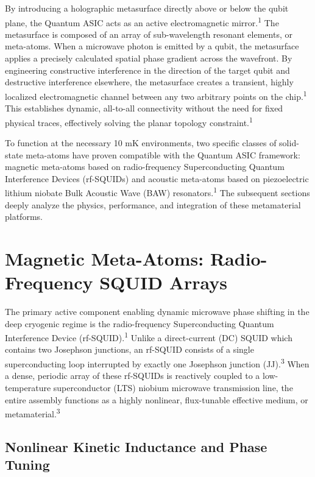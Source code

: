 \documentclass[11pt, a4paper]{article}
\begin{document}
By introducing a holographic metasurface directly above or below the qubit plane, the Quantum ASIC acts as an active electromagnetic mirror.\textsuperscript{1} The metasurface is composed of an array of sub-wavelength resonant elements, or meta-atoms. When a microwave photon is emitted by a qubit, the metasurface applies a precisely calculated spatial phase gradient across the wavefront. By engineering constructive interference in the direction of the target qubit and destructive interference elsewhere, the metasurface creates a transient, highly localized electromagnetic channel between any two arbitrary points on the chip.\textsuperscript{1} This establishes dynamic, all-to-all connectivity without the need for fixed physical traces, effectively solving the planar topology constraint.\textsuperscript{1}

To function at the necessary 10 mK environments, two specific classes of solid-state meta-atoms have proven compatible with the Quantum ASIC framework: magnetic meta-atoms based on radio-frequency Superconducting Quantum Interference Devices (rf-SQUIDs) and acoustic meta-atoms based on piezoelectric lithium niobate Bulk Acoustic Wave (BAW) resonators.\textsuperscript{1} The subsequent sections deeply analyze the physics, performance, and integration of these metamaterial platforms.

\section*{Magnetic Meta-Atoms: Radio-Frequency SQUID Arrays}

The primary active component enabling dynamic microwave phase shifting in the deep cryogenic regime is the radio-frequency Superconducting Quantum Interference Device (rf-SQUID).\textsuperscript{1} Unlike a direct-current (DC) SQUID which contains two Josephson junctions, an rf-SQUID consists of a single superconducting loop interrupted by exactly one Josephson junction (JJ).\textsuperscript{3} When a dense, periodic array of these rf-SQUIDs is reactively coupled to a low-temperature superconductor (LTS) niobium microwave transmission line, the entire assembly functions as a highly nonlinear, flux-tunable effective medium, or metamaterial.\textsuperscript{3}

\subsection*{Nonlinear Kinetic Inductance and Phase Tuning}
\end{document}
